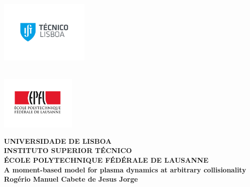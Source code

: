 \begin{titlepage}

\thispagestyle{empty}
\begin{flushleft}
    ~\\ \vspace{-3mm} \hspace{-8mm}  \includegraphics[width=44mm]{images/istnewlogo} 
\end{flushleft}
\begin{flushright}
    ~\\ \vspace{-35mm} \hspace{-5mm}  \includegraphics[width=37mm]{images/epfl}
\end{flushright}
\vspace{5mm} 
\centering
{\LARGE \textbf{
UNIVERSIDADE DE LISBOA\\\vspace{0.3cm}INSTITUTO SUPERIOR TÉCNICO
\vspace{10mm}
\\ \vspace{0.5cm}ÉCOLE POLYTECHNIQUE FÉDÉRALE DE LAUSANNE
}}
~\\ \vspace{20mm} %
\LARGE \textbf{A moment-based model for plasma dynamics at arbitrary collisionality}
\\ \vspace{13mm}
\Large \textbf{Rogério Manuel Cabete de Jesus Jorge}
\\ \vspace{13mm}

\end{titlepage}
